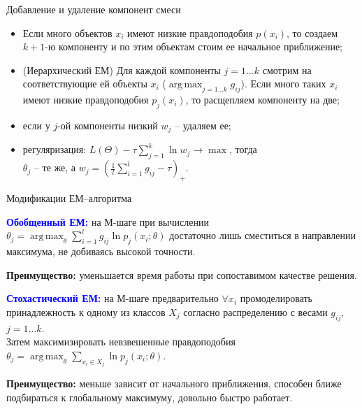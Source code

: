 \documentclass[unicode, notheorems, pdf]{beamer}
\DeclareMathOperator*{\argmax}{arg\,\max}
\begin{document}
\begin{frame}{Добавление и удаление компонент смеси}

	\begin{itemize}
		\item Если много объектов $x_i$ имеют низкие правдоподобия $p(x_i)$, то создаем $k+1$-ю компоненту и по этим объектам стоим ее начальное приближение;
		\pause
		\item (Иерархический ЕМ) Для каждой компоненты $j=1\dots k$ смотрим на соответствующие ей объекты $x_i$ ($\displaystyle\argmax_{j=1\dots k}g_{ij}$). Если много таких $x_i$ имеют низкие правдоподобия $p_j(x_i)$, то расщепляем компоненту на две;
		\pause
		\item если у $j$-ой компоненты низкий $w_j$ -- удаляем ее;
		\pause
		\item регуляризация: $L(\Theta)-\tau\displaystyle\sum_{j=1}^k\ln w_j\to\max$, тогда\\
		$\theta_j$ -- те же, а $w_j=\left(\frac{1}{l}\displaystyle\sum_{i=1}^lg_{ij}-\tau\right)_{+}$.
	\end{itemize}
\end{frame}

\begin{frame}{Модификации ЕМ--алгоритма}
	
	\textcolor{blue}{\bf Обобщенный ЕМ:} на М-шаге при вычислении
	$\theta_j=\displaystyle\argmax_{\theta}\displaystyle\sum_{i=1}^lg_{ij}\ln p_j(x_i;\theta)$ достаточно лишь сместиться в направлении максимума, не добиваясь высокой точности.

	{\bf Преимущество:} уменьшается время работы при сопоставимом качестве решения.

	\pause
	\vspace{.25cm}
	\textcolor{blue}{\bf Стохастический ЕМ:} на М-шаге предварительно $\forall x_i$ промоделировать принадлежность к одному из классов $X_j$ согласно распределению с весами $g_{ij}$, $j=1 \dots k$.\\
	Затем максимизировать невзвешенные правдоподобия
	$\theta_j=\displaystyle\argmax_{\theta}\displaystyle\sum_{x_i\in X_j}\ln p_j(x_i;\theta)$.

	{\bf Преимущество:} меньше зависит от начального приближения, способен ближе подбираться к глобальному максимуму, довольно быстро работает.
\end{frame}
\end{document}
